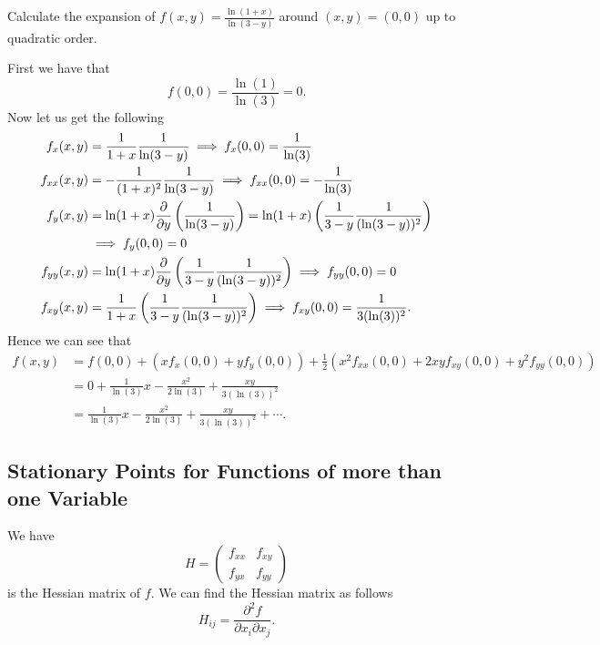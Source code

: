 \documentclass[10pt, a4paper]{article}
\begin{document}
\begin{example}
    Calculate the expansion of $f(x, y) = \frac{\ln(1 + x)}{\ln(3 - y)}$ around $(x, y) = (0, 0)$ up to quadratic order.

    \begin{solution}
        First we have that
        \[
        f(0, 0) = \frac{\ln(1)}{\ln(3)} = 0.
        \]
        Now let us get the following
        \begin{align*}
            f_{x}(x, y) &= \frac{1}{1 + x}\frac{1}{\ln(3 - y)} \implies f_{x}(0, 0) = \frac{1}{\ln(3)} \\
            f_{xx}(x, y) &= -\frac{1}{(1 + x) ^ 2}\frac{1}{\ln(3 - y)} \implies f_{xx}(0, 0) = -\frac{1}{\ln(3)} \\
            f_{y}(x, y) &= \ln(1 + x)\frac{\partial }{\partial y}\left(\frac{1}{\ln(3 - y)}\right) = \ln(1 + x)\left(\frac{1}{3 - y}\frac{1}{(\ln(3 - y)) ^ 2}\right) \\ &\implies f_{y}(0, 0) = 0 \\
            f_{yy}(x, y) &= \ln(1 + x)\frac{\partial }{\partial y}\left(\frac{1}{3 - y}\frac{1}{(\ln(3 - y)) ^ 2}\right) \implies f_{yy}(0, 0) = 0 \\
            f_{xy}(x, y) &= \frac{1}{1 + x}\left(\frac{1}{3 - y}\frac{1}{(\ln(3 - y)) ^ 2}\right) \implies f_{xy}(0, 0) = \frac{1}{3(\ln(3)) ^ 2}.
        \end{align*}
        Hence we can see that
        \begin{align*}
            f(x, y) &= f(0, 0) + (xf_{x}(0, 0) + yf_{y}(0, 0)) + \frac{1}{2}(x ^ 2f_{xx}(0, 0) + 2xyf_{xy}(0, 0) + y ^ 2f_{yy}(0, 0)) \\
            &= 0 + \frac{1}{\ln(3)}x - \frac{x ^ 2}{2\ln(3)} + \frac{xy}{3(\ln(3)) ^ 2} \\
            &= \frac{1}{\ln(3)}x - \frac{x ^ 2}{2\ln(3)} + \frac{xy}{3(\ln(3)) ^ 2} + \dotsi.
        \end{align*}
    \end{solution}
\end{example}

\subsection{Stationary Points for Functions of more than one Variable}
We have
\[
H = \begin{pmatrix}
    f_{xx} & f_{xy} \\
    f_{yx} & f_{yy}
\end{pmatrix}
\]
is the Hessian matrix of $f$.
We can find the Hessian matrix as follows
\[
H_{ij} = \frac{\partial ^ 2f}{\partial x_i\partial x_j}.
\]
\end{document}
